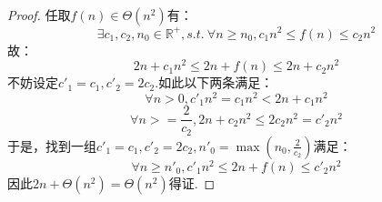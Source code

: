 \begin{proof}
    任取$f(n)\in \Theta(n^2)$有：
    $$\exists c_1,c_2,n_0 \in \mathbb R^+, s.t.~
    \forall n \ge n_0, c_1n^2 \le f(n) \le c_2n^2 $$
    故：
    $$2n + c_1n^2 \le 2n + f(n) \le 2n + c_2n^2 $$
    不妨设定$c'_1=c_1,c'_2=2c_2$.如此以下两条满足：
    $$\forall n>0, c'_1n^2 = c_1n^2 < 2n + c_1n^2$$
    $$\forall n>=\frac{2}{c_2},2n + c_2n^2 \le 2c_2n^2 = c'_2n^2$$
    于是，找到一组$c'_1=c_1,c'_2=2c_2,n'_0=\max(n_0,\frac{2}{c_2})$满足：
    $$\forall n \ge n'_0, c'_1n^2 \le 2n + f(n) \le c'_2n^2 $$
    因此$2n + \Theta(n^2)= \Theta(n^2)$得证.
\end{proof}